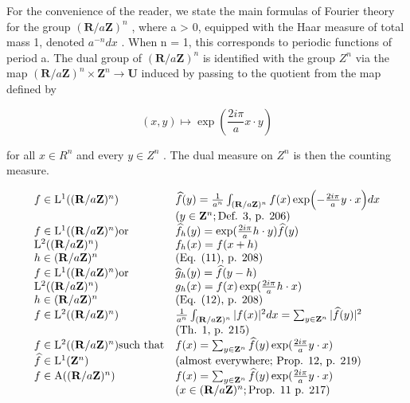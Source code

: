 
For the convenience of the reader, we state the main formulas of Fourier theory for the group \((\mathbf{R}/a\mathbf{Z})^{n}\) , where a \textgreater{} 0, equipped with the Haar measure of total mass 1, denoted \(a^{-n} dx\) . When n = 1, this corresponds to periodic functions of period a. The dual group of \((\mathbf{R}/a\mathbf{Z})^{n}\) is identified with the group \(Z^{n}\) via the map \((\mathbf{R}/a\mathbf{Z})^{n} \times \mathbf{Z}^{n} \to \mathbf{U}\) induced by passing to the quotient from the map defined by

\[
(x, y) \mapsto \exp \left(\frac {2 i \pi}{a} x \cdot y\right)
\]

for all \(x \in R^{n}\) and every \(y \in Z^{n}\) . The dual measure on \(Z^{n}\) is then the counting measure.

\[
\begin{array}{l l} f \in \mathrm{L} ^ {1} ((\mathbf {R} / a \mathbf {Z}) ^ {n}) & \widehat {f} (y) = \frac {1}{a ^ {n}} \int_ {(\mathbf {R} / a \mathbf {Z}) ^ {n}} f (x) \exp \Bigl (- \frac {2 i \pi}{a} y \cdot x \Bigr) d x \\ & (y \in \mathbf {Z} ^ {n}; \text {Def. 3, p. 206}) \\ f \in \mathrm{L} ^ {1} ((\mathbf {R} / a \mathbf {Z}) ^ {n}) \text {or} & \widehat {f} _ {h} (y) = \exp (\frac {2 i \pi}{a} h \cdot y) \widehat {f} (y) \\ \mathrm{L} ^ {2} ((\mathbf {R} / a \mathbf {Z}) ^ {n}) & f _ {h} (x) = f (x + h) \\ h \in (\mathbf {R} / a \mathbf {Z}) ^ {n} & (\text {Eq. (11), p. 208}) \\ f \in \mathrm{L} ^ {1} ((\mathbf {R} / a \mathbf {Z}) ^ {n}) \text {or} & \widehat {g} _ {h} (y) = \widehat {f} (y - h) \\ \mathrm{L} ^ {2} ((\mathbf {R} / a \mathbf {Z}) ^ {n}) & g _ {h} (x) = f (x) \exp (\frac {2 i \pi}{a} h \cdot x) \\ h \in (\mathbf {R} / a \mathbf {Z}) ^ {n} & (\text {Eq. (12), p. 208}) \\ f \in \mathrm{L} ^ {2} ((\mathbf {R} / a \mathbf {Z}) ^ {n}) & \frac {1}{a ^ {n}} \int_ {(\mathbf {R} / a \mathbf {Z}) ^ {n}} | f (x) | ^ {2} d x = \sum_ {y \in \mathbf {Z} ^ {n}} | \widehat {f} (y) | ^ {2} \\ & (\text {Th. 1, p. 215}) \\ f \in \mathrm{L} ^ {2} ((\mathbf {R} / a \mathbf {Z}) ^ {n}) \text {such that} & f (x) = \sum_ {y \in \mathbf {Z} ^ {n}} \widehat {f} (y) \exp (\frac {2 i \pi}{a} y \cdot x) \\ \widehat {f} \in \mathrm{L} ^ {1} (\mathbf {Z} ^ {n}) & (\text {almost everywhere; Prop. 12, p. 219}) \\ f \in \mathrm{A} ((\mathbf {R} / a \mathbf {Z}) ^ {n}) & f (x) = \sum_ {y \in \mathbf {Z} ^ {n}} \widehat {f} (y) \exp (\frac {2 i \pi}{a} y \cdot x) \\ & (x \in (\mathbf {R} / a \mathbf {Z}) ^ {n}; \text {Prop. 11 p. 217}) \end{array}
\]

